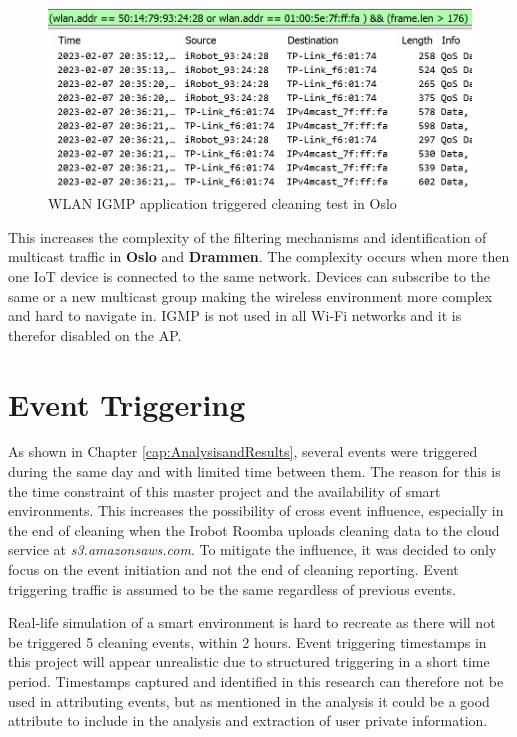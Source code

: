 \begin{figure}[H]
    \centering
    \includegraphics[width=\textwidth]{figures/WLAN_IGMP_ALL.png}
    \caption{\gls{WLAN} IGMP application triggered cleaning test in Oslo}
    \label{fig:WLANIGMP_all_enabled}
\end{figure}

This increases the complexity of the filtering mechanisms and identification of multicast traffic in \textbf{Oslo} and \textbf{Drammen}. The complexity occurs when more then one \gls{IoT} device is connected to the same network. Devices can subscribe to the same or a new multicast group making the wireless environment more complex and hard to navigate in. \gls{IGMP} is not used in all \gls{Wi-Fi} networks \cite{wifi_ieee80211} and it is therefor disabled on the AP. 

\section{Event Triggering}
As shown in Chapter \ref{cap:AnalysisandResults}, several events were triggered during the same day and with limited time between them. The reason for this is the time constraint of this master project and the availability of smart environments. This increases the possibility of cross event influence, especially in the end of cleaning when the Irobot Roomba uploads cleaning data to the cloud service at \textit{s3.amazonsaws.com}. To mitigate the influence, it was decided to only focus on the event initiation and not the end of cleaning reporting. Event triggering traffic is assumed to be the same regardless of previous events. 

Real-life simulation of a smart environment is hard to recreate as there will not be triggered 5 cleaning events, within 2 hours. Event triggering timestamps in this project will appear unrealistic due to structured triggering in a short time period. Timestamps captured and identified in this research can therefore not be used in attributing events, but as mentioned in the analysis it could be a good attribute to include in the analysis and extraction of user private information.  

